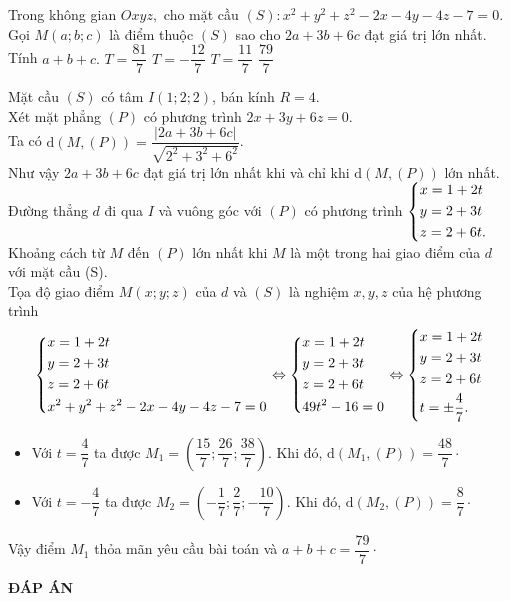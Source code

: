 \begin{ex}%
Trong không gian $ Oxyz, $	cho mặt cầu $ (S)\colon x^2+y^2+z^2-2x-4y-4z-7=0. $ Gọi $ M(a;b;c) $ là điểm thuộc $ (S) $ sao cho $ 2a+3b+6c $ đạt giá trị lớn nhất. Tính $ a+b+c. $
	\choice
	{$ T=\dfrac{81}{7} $}
	{$ T=-\dfrac{12}{7} $}
	{$ T=\dfrac{11}{7} $}
	{\True $ \dfrac{79}{7} $}
	\loigiai
	{Mặt cầu $ (S) $ có tâm $ I(1;2;2) $, bán kính $ R=4. $\\
	Xét mặt phẳng $ (P) $	có phương trình $ 2x+3y+6z=0 $.\\
	Ta có $ \mathrm{d}\left(M,(P)\right)=\dfrac{\left|2a+3b+6c\right|}{\sqrt{2^2+3^2+6^2}} $.\\
	Như vậy $ 2a+3b+6c $ đạt giá trị lớn nhất khi và chỉ khi $ \mathrm{d}\left(M,(P)\right) $ lớn nhất.\\
	Đường thẳng $ d $ đi qua $ I $ và vuông góc với $ (P) $ có phương trình $ \left\{\begin{aligned}&x=1+2t\\&y=2+3t\\&z=2+6t.\end{aligned}\right. $\\
	Khoảng cách từ $ M $ đến $ (P) $ lớn nhất khi $ M $ là một trong hai giao điểm của $ d $ với mặt cầu (S).\\
	Tọa độ giao điểm $ M(x;y;z) $ của $ d $ và $ (S) $ là nghiệm  $ x,y,z $ của hệ phương trình
	\begin{eqnarray*}
\left\{\begin{aligned}&x=1+2t\\&y=2+3t\\&z=2+6t\\&x^2+y^2+z^2-2x-4y-4z-7=0\end{aligned}\right. \Leftrightarrow \left\{\begin{aligned}&x=1+2t\\&y=2+3t\\&z=2+6t\\&49t^2-16=0\end{aligned}\right. \Leftrightarrow \left\{\begin{aligned}&x=1+2t\\&y=2+3t\\&z=2+6t\\&t=\pm \dfrac{4}{7}.\end{aligned}\right.
	\end{eqnarray*}
	\begin{itemize}
		\item Với $ t=\dfrac{4}{7} $ ta được $ M_1 = \left(\dfrac{15}{7};\dfrac{26}{7};\dfrac{38}{7}\right) $. Khi đó, $ \mathrm{d}\left(M_1,(P)\right)=\dfrac{48}{7}\cdot $
		\item Với $ t=-\dfrac{4}{7} $ ta được $ M_2 = \left(-\dfrac{1}{7};\dfrac{2}{7};-\dfrac{10}{7}\right) $. Khi đó, $ \mathrm{d}\left(M_2,(P)\right)=\dfrac{8}{7}\cdot $
	\end{itemize}
Vậy điểm $ M_1 $ thỏa mãn yêu cầu bài toán và $ a+b+c=\dfrac{79}{7}\cdot $
	}
\end{ex}
\newpage
\begin{center}
	\textbf{ĐÁP ÁN}
\end{center}
\begin{multicols}{10}
	 
\end{multicols}


